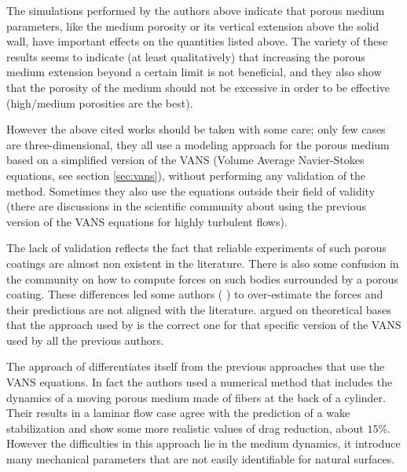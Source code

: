 The simulations performed by the authors above indicate that porous medium parameters, like the medium porosity or its vertical extension above the solid wall, have important effects on the quantities listed above.
The variety of these results seems to indicate (at least qualitatively) that increasing the porous medium extension beyond a certain limit is not beneficial, and they also show that the porosity of the medium should not be excessive in order to be effective (high/medium porosities are the best).

However the above cited works should be taken with some care; only few cases are three-dimensional, they all use a modeling approach for the porous medium based on a simplified version of the VANS (Volume Average Navier-Stokes equations, see section \ref{sec:vans}), without performing any validation of the method.
Sometimes they also use the equations outside their field of validity (there are discussions in the scientific community about using the previous version of the VANS equations for highly turbulent flows).

The lack of validation reflects the fact that reliable experiments of such porous coatings are almost non existent in the literature.
There is also some confusion in the community on how to compute forces on such bodies surrounded by a porous coating. These differences led some authors ( \citet{naito2012numerical}) to over-estimate the forces and their predictions are not aligned with the literature.
\citet{caltagirone1994interaction} argued on theoretical bases that the approach used by \citet{bruneau2004passive} is the correct one for that specific version of the VANS used by all the previous authors. 

 
The approach of \citet{favier2009passive} differentiates itself from the previous approaches that use the VANS equations. In fact the authors used a numerical method that includes the dynamics of a moving porous medium made of fibers at the back of a cylinder.
Their results in a laminar flow case agree with the prediction of a wake stabilization and show some more realistic values of drag reduction, about $15\%$.
However the difficulties in this approach lie in the medium dynamics, it introduce many mechanical parameters that are not easily identifiable for natural surfaces.

